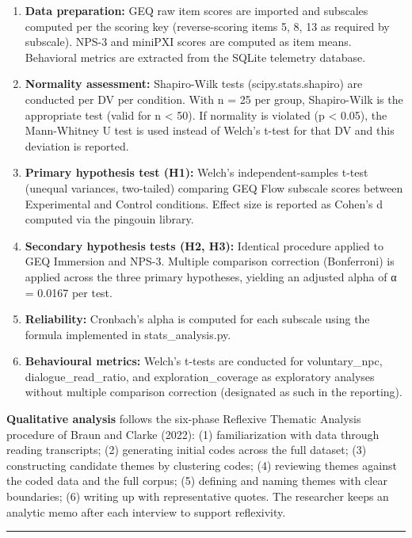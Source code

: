 \begin{enumerate}
\def\labelenumi{\arabic{enumi}.}
\item
  \textbf{Data preparation:} GEQ raw item scores are imported and
  subscales computed per the scoring key (reverse-scoring items 5, 8, 13
  as required by subscale). NPS-3 and miniPXI scores are computed as
  item means. Behavioral metrics are extracted from the SQLite telemetry
  database.
\item
  \textbf{Normality assessment:} Shapiro-Wilk tests
  (scipy.stats.shapiro) are conducted per DV per condition. With n = 25
  per group, Shapiro-Wilk is the appropriate test (valid for n
  \textless{} 50). If normality is violated (p \textless{} 0.05), the
  Mann-Whitney U test is used instead of Welch's t-test for that DV and
  this deviation is reported.
\item
  \textbf{Primary hypothesis test (H1):} Welch's independent-samples
  t-test (unequal variances, two-tailed) comparing GEQ Flow subscale
  scores between Experimental and Control conditions. Effect size is
  reported as Cohen's d computed via the pingouin library.
\item
  \textbf{Secondary hypothesis tests (H2, H3):} Identical procedure
  applied to GEQ Immersion and NPS-3. Multiple comparison correction
  (Bonferroni) is applied across the three primary hypotheses, yielding
  an adjusted alpha of α = 0.0167 per test.
\item
  \textbf{Reliability:} Cronbach's alpha is computed for each subscale
  using the formula implemented in stats\_analysis.py.
\item
  \textbf{Behavioural metrics:} Welch's t-tests are conducted for
  voluntary\_npc, dialogue\_read\_ratio, and exploration\_coverage as
  exploratory analyses without multiple comparison correction
  (designated as such in the reporting).
\end{enumerate}

\textbf{Qualitative analysis} follows the six-phase Reflexive Thematic
Analysis procedure of Braun and Clarke (2022): (1) familiarization with
data through reading transcripts; (2) generating initial codes across
the full dataset; (3) constructing candidate themes by clustering codes;
(4) reviewing themes against the coded data and the full corpus; (5)
defining and naming themes with clear boundaries; (6) writing up with
representative quotes. The researcher keeps an analytic memo after each
interview to support reflexivity.

\begin{center}\rule{0.5\linewidth}{0.5pt}\end{center}

